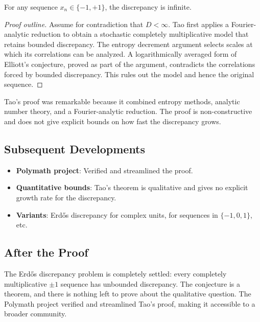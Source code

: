 \begin{theorem}
For any sequence $x_n \in \{-1, +1\}$, the discrepancy is infinite.
\end{theorem}

\begin{proof}[Proof outline]
Assume for contradiction that $D < \infty$. Tao first applies a Fourier-analytic reduction to obtain a stochastic completely multiplicative model that retains bounded discrepancy. The entropy decrement argument selects scales at which its correlations can be analyzed. A logarithmically averaged form of Elliott's conjecture, proved as part of the argument, contradicts the correlations forced by bounded discrepancy. This rules out the model and hence the original sequence.
\end{proof}

\begin{highlightbox}
Tao's proof was remarkable because it combined entropy methods, analytic number theory, and a Fourier-analytic reduction. The proof is non-constructive and does not give explicit bounds on how fast the discrepancy grows.
\end{highlightbox}

\subsection{Subsequent Developments}
\begin{itemize}
\item \textbf{Polymath project}: Verified and streamlined the proof.
\item \textbf{Quantitative bounds}: Tao's theorem is qualitative and gives no explicit growth rate for the discrepancy.
\item \textbf{Variants}: Erdős discrepancy for complex units, for sequences in $\{-1,0,1\}$, etc.
\end{itemize}

\subsection{After the Proof}

The Erd\H{o}s discrepancy problem is completely settled: every completely multiplicative $\pm 1$ sequence has unbounded discrepancy. The conjecture is a theorem, and there is nothing left to prove about the qualitative question. The Polymath project verified and streamlined Tao's proof, making it accessible to a broader community.

